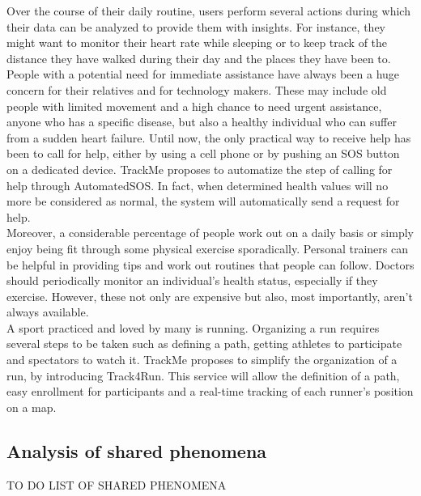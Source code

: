 \documentclass{report}
\begin{document}
Over the course of their daily routine, users perform several actions during which their data can be analyzed to provide them with insights. For instance, they might want to monitor their heart rate while sleeping or to keep track of the distance they have walked during their day and the places they have been to.\\

People with a potential need for immediate assistance have always been a huge concern for their relatives and for technology makers. These may include old people with limited movement and a high chance to need urgent assistance, anyone who has a specific disease, but also a healthy individual who can suffer from a sudden heart failure. Until now, the only practical way to receive help has been to call for help, either by using a cell phone or by pushing an SOS button on a dedicated device. TrackMe proposes to automatize the step of calling for help through AutomatedSOS. In fact, when determined health values will no more be considered as normal, the system will automatically send a request for help.\\

Moreover, a considerable percentage of people work out on a daily basis or simply enjoy being fit through some physical exercise sporadically. Personal trainers can be helpful in providing tips and work out routines that people can follow. Doctors should periodically monitor an individual’s health status, especially if they exercise. However, these not only are expensive but also, most importantly, aren’t always available.\\
A sport practiced and loved by many is running. Organizing a run requires several steps to be taken such as defining a path, getting athletes to participate and spectators to watch it. TrackMe proposes to simplify the organization of a run, by introducing Track4Run. This service will allow the definition of a path, easy enrollment for participants and a real-time tracking of each runner’s position on a map.
			\subsection{Analysis of shared phenomena}
			TO DO LIST OF SHARED PHENOMENA
			
\end{document}
